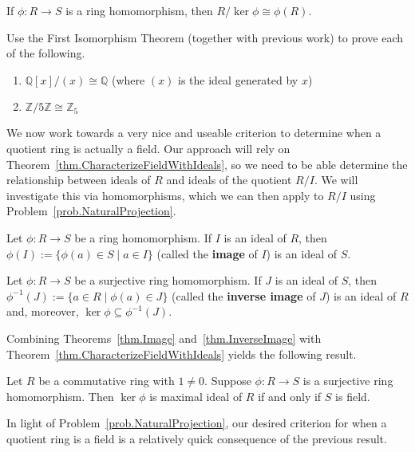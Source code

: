 \begin{theorem}\label{thm.FirstIsoRings}
If $\phi:R\to S$ is a ring homomorphism, then  $R/\ker \phi\cong \phi(R)$.
\end{theorem}

\begin{problem}
Use the First Isomorphism Theorem (together with previous work) to prove each of the following. 
\begin{enumerate}
\item $\mathbb{Q}[x]/(x) \cong \mathbb{Q}$ (where $(x)$ is the ideal generated by $x$)
\item $\mathbb{Z}/5\mathbb{Z} \cong \mathbb{Z}_5$
\end{enumerate}
\end{problem}

We now work towards a very nice and useable criterion to determine when a quotient ring is actually a field. Our approach will rely on Theorem~\ref{thm.CharacterizeFieldWithIdeals}, so we need to be able determine the relationship between ideals of $R$ and ideals of the quotient $R/I$. We will investigate this via homomorphisms, which we can then apply to $R/I$ using Problem~\ref{prob.NaturalProjection}.

\begin{theorem}\label{thm.Image}
Let $\phi:R\to S$ be a ring homomorphism. If $I$ is an ideal of $R$, then $\phi(I) := \{\phi(a)\in S\mid a\in I\}$ (called the \textbf{image} of $I$) is an ideal of $S$.
\end{theorem}

\begin{theorem}\label{thm.InverseImage}
Let $\phi:R\to S$ be a surjective ring homomorphism. If $J$ is an ideal of $S$, then $\phi^{-1}(J) := \{a\in R\mid\phi(a) \in J\}$ (called the \textbf{inverse image} of $J$) is an ideal of $R$ and, moreover,  $\ker\phi \subseteq \phi^{-1}(J)$.
\end{theorem}

Combining Theorems~\ref{thm.Image} and~\ref{thm.InverseImage} with Theorem~\ref{thm.CharacterizeFieldWithIdeals} yields the following result.

\begin{theorem}
Let $R$ be a commutative ring with $1\neq0$. Suppose $\phi:R\to S$ is a surjective ring homomorphism. Then $\ker\phi$ is maximal ideal of $R$ if and only if $S$ is field.
\end{theorem}

In light of Problem~\ref{prob.NaturalProjection}, our desired criterion for when a quotient ring is  a field is a relatively quick consequence of the previous result. 

